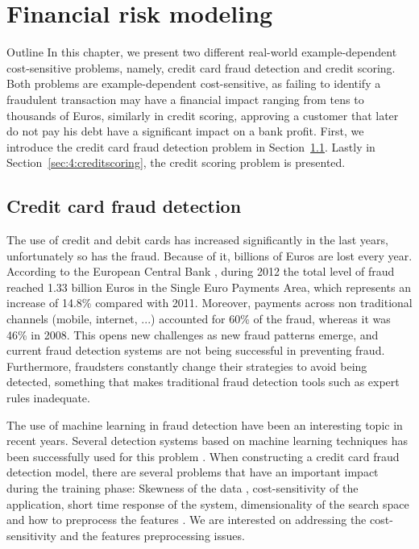 \chapter{Financial risk modeling}\label{ch:4}

\begin{remark}{Outline}
In this chapter, we present two different real-world example-dependent 
cost-sensitive problems, namely, credit card fraud detection and credit scoring. Both problems 
are example-dependent cost-sensitive, as failing to identify a fraudulent transaction may have a 
financial impact ranging from tens to thousands of Euros, similarly in credit scoring, approving a 
customer that later do not pay his debt have a significant impact on a bank profit.
First, we introduce the credit card fraud detection problem in Section~\ref{sec:4:fraud}. Lastly in 
Section~\ref{sec:4:creditscoring}, the credit scoring problem is presented.
\end{remark}

\section{Credit card fraud detection}
\label{sec:4:fraud}

  The use of credit and debit cards has increased significantly   in the last years, unfortunately 
	so has the fraud. Because of it, billions of Euros are lost every year. According to 
	the European Central Bank \citep{EuropeanCentralBank2013}, during 2012 the total level of fraud 
	reached 1.33 billion Euros in the Single Euro Payments Area, which represents an increase of 
	14.8\% compared with 2011. Moreover, payments across non traditional channels (mobile, internet, 
	...) accounted for 60\% of the fraud, whereas it was 46\% in 2008. This opens new challenges as 
	new fraud patterns emerge, and current fraud detection systems are not being successful in 
	preventing fraud. Furthermore, fraudsters constantly change their strategies to avoid being 
	detected, something that makes traditional fraud detection tools such as expert rules inadequate.
  
  The use of machine learning in fraud detection have been an interesting topic in recent years. 
  Several detection systems based on machine learning techniques has been successfully used 
	for this problem \citep{Bhattacharyya2011}. When constructing a credit card fraud detection 
  model, there are several problems that have an important impact during the training phase: 
  Skewness of 	the data , cost-sensitivity of the application, short time response of the system, 
  dimensionality of the search space and how to preprocess the features
	\citep{Bolton2002,Gadi2008,Whitrow2008,DalPozzolo2014}.	We are interested on 
	addressing the cost-sensitivity and the features preprocessing 	issues. 
	
